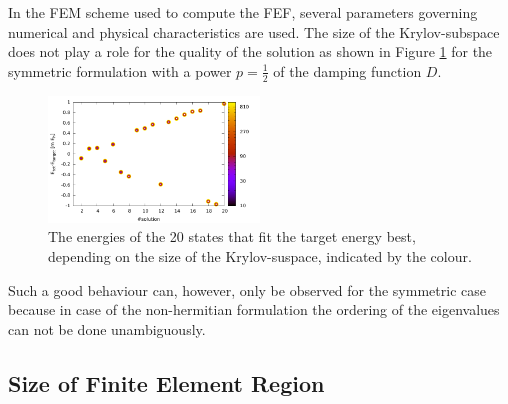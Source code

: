 In the FEM scheme used to compute the FEF, several parameters governing numerical and physical characteristics are used.
The size of the Krylov-subspace does not play a role for the quality of the solution as shown in Figure \ref{fig:E_nev} for the symmetric formulation with a power $p=\frac 12$ of the damping function $D$.
\begin{figure}
\includegraphics[width=0.5\textwidth]{Figures/Root_E_nev.pdf}
\caption{The energies of the 20 states that fit the target energy best, depending on the
size of the Krylov-suspace, indicated by the colour.}
\label{fig:E_nev}
\end{figure}
Such a good behaviour can, however, only be observed for the symmetric case because in case of the non-hermitian formulation the ordering of the eigenvalues can not be done unambiguously.

\subsection{Size of Finite Element Region}
